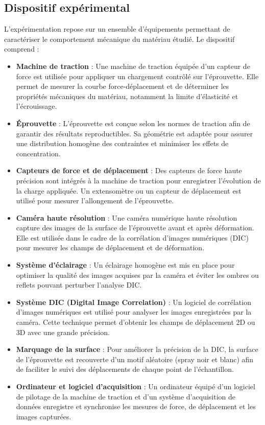 \documentclass[12pt,a4paper]{article}
\begin{document}
\subsection{Dispositif expérimental}

L'expérimentation repose sur un ensemble d'équipements permettant de caractériser le comportement mécanique du matériau étudié. Le dispositif comprend :

\begin{itemize}
    \item \textbf{Machine de traction} : Une machine de traction équipée d'un capteur de force est utilisée pour appliquer un chargement contrôlé sur l'éprouvette. Elle permet de mesurer la courbe force-déplacement et de déterminer les propriétés mécaniques du matériau, notamment la limite d'élasticité et l'écrouissage.
    
    \item \textbf{Éprouvette} : L’éprouvette est conçue selon les normes de traction afin de garantir des résultats reproductibles. Sa géométrie est adaptée pour assurer une distribution homogène des contraintes et minimiser les effets de concentration.

    \item \textbf{Capteurs de force et de déplacement} : Des capteurs de force haute précision sont intégrés à la machine de traction pour enregistrer l'évolution de la charge appliquée. Un extensomètre ou un capteur de déplacement est utilisé pour mesurer l'allongement de l'éprouvette.

    \item \textbf{Caméra haute résolution} : Une caméra numérique haute résolution capture des images de la surface de l'éprouvette avant et après déformation. Elle est utilisée dans le cadre de la corrélation d'images numériques (DIC) pour mesurer les champs de déplacement et de déformation.

    \item \textbf{Système d’éclairage} : Un éclairage homogène est mis en place pour optimiser la qualité des images acquises par la caméra et éviter les ombres ou reflets pouvant perturber l'analyse DIC.

    \item \textbf{Système DIC (Digital Image Correlation)} : Un logiciel de corrélation d’images numériques est utilisé pour analyser les images enregistrées par la caméra. Cette technique permet d’obtenir les champs de déplacement 2D ou 3D avec une grande précision.

    \item \textbf{Marquage de la surface} : Pour améliorer la précision de la DIC, la surface de l’éprouvette est recouverte d’un motif aléatoire (spray noir et blanc) afin de faciliter le suivi des déplacements de chaque point de l’échantillon.

    \item \textbf{Ordinateur et logiciel d'acquisition} : Un ordinateur équipé d’un logiciel de pilotage de la machine de traction et d’un système d’acquisition de données enregistre et synchronise les mesures de force, de déplacement et les images capturées.
\end{itemize}
\end{document}
